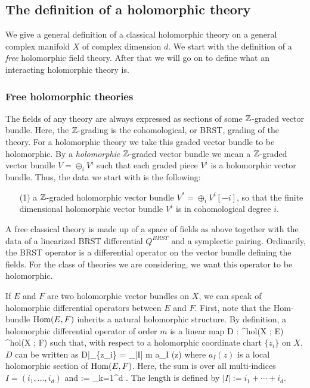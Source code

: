 \subsection{The definition of a holomorphic theory}

We give a general definition of a classical holomorphic theory on a general complex manifold $X$ of complex dimension $d$.
We start with the definition of a {\em free} holomorphic field theory. 
After that we will go on to define what an interacting holomorphic theory is.

\subsubsection{Free holomorphic theories}

The fields of any theory are always expressed as sections of some $\mathbb Z$-graded vector bundle.
Here, the $\mathbb Z$-grading is the cohomological, or BRST, grading of the theory.
For a holomorphic theory we take this graded vector bundle to be holomorphic.  
By a {\em holomorphic} $\mathbb Z$-graded vector bundle we mean a $\mathbb Z$-graded vector bundle $
V = \oplus_i V^i$ such that each graded piece $V^i$ is a holomorphic vector bundle. 
Thus, the data we start with is the following:

\begin{itemize}
\item[(1)] a $\mathbb Z$-graded holomorphic vector bundle $V^* = \oplus_i V^i [-i]$, so that the finite dimensional holomorphic vector bundle $V^i$ is in cohomological degree $i$. 
\end{itemize}

A free classical theory is made up of a space of fields as above together with the data of a linearized BRST differential $Q^{BRST}$ and a symplectic pairing. 
Ordinarily, the BRST operator is a differential operator on the vector bundle defining the fields. 
For the class of theories we are considering, we want this operator to be holomorphic. 

If $E$ and $F$ are two holomorphic vector bundles on $X$, we can speak of holomorphic differential operators between $E$ and $F$. 
First, note that the Hom-bundle ${\rm Hom}(E,F)$ inherits a natural holomorphic structure. 
By definition, a holomorphic differential operator of order $m$ is a linear map
\ben
D : \Gamma^{hol}(X ; E) \to \Gamma^{hol}(X ; F)
\een
such that, with respect to a holomorphic coordinate chart $\{z_i\}$ on $X$, $D$ can be written as
\be\label{local holomorphic}
D|_{\{z_i\}} = \sum_{|I| \leq m} a_I (z) 
\ee
where $a_I(z)$ is a local holomorphic section of ${\rm Hom}(E,F)$.
Here, the sum is over all multi-indices $I = (i_1,\ldots, i_d)$ and 
\ben
{} := \prod_{k=1}^d  . 
\een 
The length is defined by $|I| := i_1 + \cdots + i_d$. 

